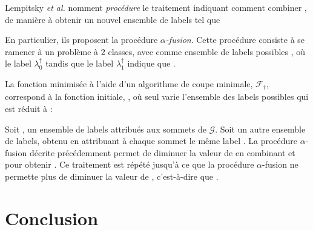 Lempitsky \textit{et al.} \cite{lempitsky2010fusion} nomment \textit{\og procédure \fg} le traitement indiquant comment combiner  , de manière à obtenir un nouvel ensemble de labels  tel que 

En particulier, ils proposent la procédure $\alpha$\emph{-fusion}. Cette procédure consiste à se ramener à un problème à $2$ classes, avec comme ensemble de labels possibles , où le label $\lambda^{\dagger}_{0}$    tandis que le label $\lambda^{\dagger}_{1}$ indique que . 

La fonction  minimisée à l'aide d'un algorithme de coupe minimale, $\mathcal{F}_{\dagger }$, correspond à la fonction  initiale, , où seul varie l'ensemble des labels possibles qui est réduit à \modif{$\Lambda^{\dagger}$} : 

Soit , un ensemble de labels attribués aux sommets de $\mathcal{G}$. Soit  un autre ensemble de labels, obtenu en attribuant à chaque sommet le même label . La procédure $\alpha$-fusion décrite précédemment permet de diminuer la valeur de  en combinant  et  pour obtenir . Ce traitement est répété jusqu'à ce que la procédure $\alpha$-fusion ne permette plus de diminuer la valeur de , c'est-à-dire que .

\section{Conclusion} 

